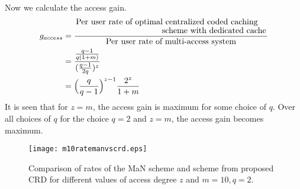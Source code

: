 \documentclass[conference]{IEEEtran}
\begin{document}
    Now we calculate the access gain.
    \begin{align*}
   g_{access} &= \frac{\splitfrac{\text{Per user rate of optimal centralized coded caching}}{\text{scheme  with dedicated cache}}}{\text{Per user rate of multi-access system}}\\
     &= \frac{\frac{q-1}{q(1+m)}}{({\frac{q-1}{2q}})^z}\\
     &= {\Big(\frac{q}{q-1}\Big)}^{z - 1} \frac{2^z}{1+m}
    \end{align*}
    It is seen that for $z = m$, the access gain is maximum for some choice of $q$. Over all choices of $q$ for the choice $q = 2$ and $z = m$, the access gain becomes maximum.\\
    	\begin{figure}
    	\begin{center}
    		\texttt{[image: m10ratemanvscrd.eps]}
    		\caption {Comparison of rates of the MaN scheme and scheme from proposed CRD for different values of access degree $z$ and $m = 10, q = 2$.
    		}
    		\label{Comprateman}
    	\end{center}
        \end{figure}
\begin{comment}
	Now consider an equivalent shared link network with $K$ users each connected to a dedicated cache with access to a memory fraction $\frac{M'}{N}$ (From Lemma 1), $N \geq K$. The Maddah Ali scheme when employed on this network gives 
	$$R = \frac{K - t}{1 + t}$$ where $t = \frac{KM'}{N}$.
	Upon substituting for $K = q^z \binom{m}{z}$, $\frac{M'}{N} =  1 - (1 - \frac{1}{q})^z$,
	$$R = \frac{q^z\binom{m}{z} - (q^z - (q-1)^z)\binom{m}{z}}{1 + (q^z - (q-1)^z)\binom{m}{z}} = \frac{(q-1)^z\binom{m}{z}}{1 + (q^z - (q-1)^z)\binom{m}{z}} $$
	
	whereas the rate for the proposed multi-access scheme is
	$$R = \Big({\frac{q-1}{2}}\Big)^z \binom{m}{z}$$
	Thus the rate for the proposed multi-access scheme is larger than that of an equivalent shared link network with dedicated cache by a factor of
	$$\frac{1 + \binom{m}{z}(q^z - (q-1)^z)}{2^z}$$
	For $q = 2, z = m$, both rates are same i.e. $R = \frac{1}{2^m}$, subpacketization levels $F = 2^m$ are also same in both cases.
	i.e., the proposed multi-access scheme and the Maddah Ali scheme have the same performance if we keep $K$ and $\frac{M'}{N}$ the same for $q = 2$. For this case, if we compare the total memory required in both cases
	$$CM = mN$$ is the total memory required in the multi-access network, while
	$$KM' = q^m - (q-1)^mN = 2^m N$$ when $q = 2$, for the shared link network with dedicated cache.
	We see that the total memory required for the multi-access network by the proposed construction is much smaller than the total memory required for the shared link network with dedicated cache irrespective of the value of $q$, for $z = m$ and same $\frac{M'}{N}$. 
\end{comment}
\end{document}
